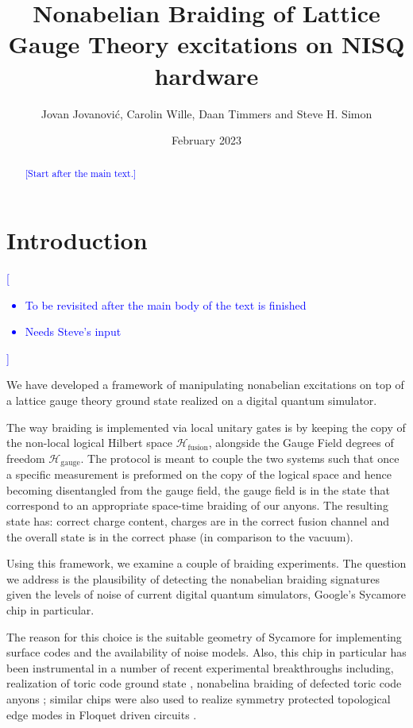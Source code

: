 \documentclass[two column]{article}
\title{Nonabelian Braiding of Lattice Gauge Theory excitations on NISQ hardware}
\author{Jovan Jovanovi\'c, Carolin Wille, Daan Timmers and Steve H. Simon}
\date{February 2023}
\newcommand{\jovan}[1]{\textcolor{blue}{[#1]}}
\begin{document}
\maketitle
\begin{abstract}
\jovan{Start after the main text.}
\end{abstract}
\tableofcontents



\section{Introduction}

\jovan{\begin{itemize}
    \item To be revisited after the main body of the text is finished
    \item Needs Steve's input
\end{itemize}}

We have developed a framework of manipulating nonabelian excitations on top of a lattice gauge theory ground state realized on a digital quantum simulator.

The way braiding is implemented via local unitary gates is by keeping the copy of the non-local logical Hilbert space $\mathcal{H}_{\text{fusion}}$, alongside the Gauge Field degrees of freedom $\mathcal{H}_{\text{gauge}}$. The protocol is meant to couple the two systems such that once a specific measurement is preformed on the copy of the logical space and hence becoming disentangled from the gauge field, the gauge field is in the state that correspond to an appropriate space-time braiding of our anyons. The resulting state has: correct charge content, charges are in the correct fusion channel and the overall state is in the correct phase (in comparison to the vacuum).

Using this framework, we examine a couple of braiding experiments. The question we address is the plausibility of detecting the nonabelian braiding signatures given the levels of noise of current digital quantum simulators, Google's Sycamore chip in particular.

The reason for this choice is the suitable geometry of Sycamore for implementing surface codes and the availability of noise models. Also, this chip in particular has been instrumental in a number of recent experimental breakthroughs including, realization of toric code ground state \cite{}, nonabelina braiding of defected toric code anyons \cite{}; similar chips were also used to realize symmetry protected topological edge modes in Floquet driven circuits \cite{}.
\end{document}
